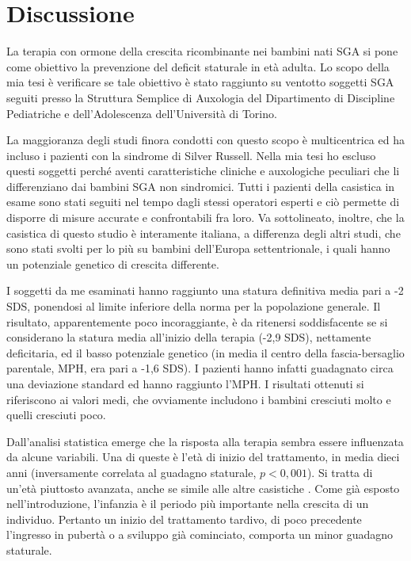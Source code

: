 \chapter{Discussione}

La terapia con ormone della crescita ricombinante nei bambini nati SGA si pone come obiettivo la prevenzione del deficit staturale in età adulta.
Lo scopo della mia tesi è verificare se tale obiettivo è stato raggiunto su ventotto soggetti SGA seguiti presso la Struttura Semplice di Auxologia del Dipartimento di Discipline Pediatriche e dell'Adolescenza dell'Università  di Torino.

La maggioranza  degli studi finora condotti con questo scopo è multicentrica ed ha incluso i pazienti con la  sindrome di Silver Russell. Nella mia tesi ho escluso questi soggetti perché aventi caratteristiche cliniche e auxologiche peculiari che li differenziano dai bambini SGA non sindromici. Tutti i pazienti della casistica in esame sono stati seguiti nel tempo dagli stessi operatori esperti e ciò permette di disporre di misure accurate e confrontabili fra loro. Va sottolineato, inoltre, che la casistica di questo studio è interamente italiana, a differenza degli altri studi, che sono stati svolti per lo più su bambini dell'Europa settentrionale, i quali hanno un potenziale genetico di crescita differente.

I soggetti da me esaminati hanno raggiunto una statura definitiva media pari a -2 SDS, ponendosi al limite inferiore della norma per la popolazione generale. Il risultato, apparentemente poco incoraggiante, è da ritenersi soddisfacente se si considerano la statura  media all'inizio della terapia (-2,9 SDS), nettamente deficitaria, ed il basso potenziale genetico (in media il centro della fascia-bersaglio parentale, MPH, era pari a -1,6 SDS). I pazienti hanno infatti guadagnato circa una deviazione standard ed hanno raggiunto l'MPH. I risultati ottenuti si riferiscono ai valori medi, che ovviamente includono i bambini cresciuti molto e quelli cresciuti poco. 

Dall'analisi statistica emerge che la risposta alla terapia sembra essere influenzata da alcune variabili.
Una di queste è l'età di inizio del trattamento, in media dieci anni (inversamente correlata al guadagno staturale, $p < 0,001$). Si tratta di un'età piuttosto avanzata, anche se simile alle altre casistiche\cite{coutant1998short} \cite{zucchini2001final}. Come già esposto nell'introduzione, l'infanzia è il periodo più importante nella crescita di un individuo. Pertanto un inizio del trattamento tardivo, di poco precedente l'ingresso in pubertà o a sviluppo già cominciato, comporta un minor guadagno staturale. 

